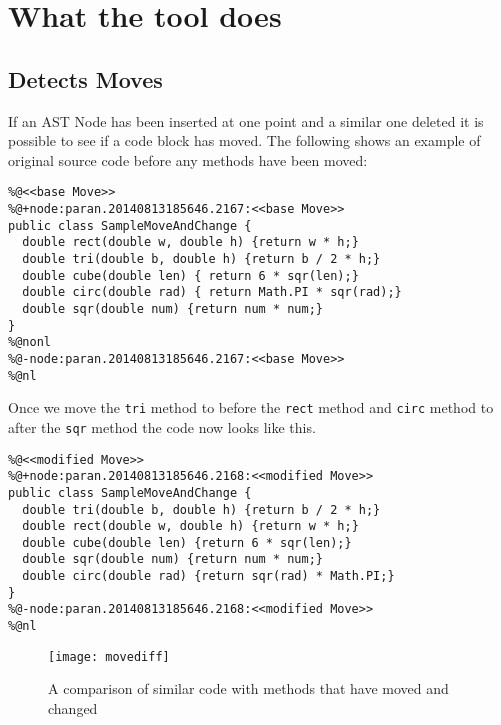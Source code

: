 \section{What the tool does}
\subsection{Detects Moves}
If an AST Node has been inserted at one point and a similar one deleted it is possible to see if a code block has moved.  
The following shows an example of original source code before any methods have been moved: 

\begin{lstlisting}
%@<<base Move>>
%@+node:paran.20140813185646.2167:<<base Move>>
public class SampleMoveAndChange {
  double rect(double w, double h) {return w * h;}
  double tri(double b, double h) {return b / 2 * h;}
  double cube(double len) { return 6 * sqr(len);}
  double circ(double rad) { return Math.PI * sqr(rad);}
  double sqr(double num) {return num * num;}
}
%@nonl
%@-node:paran.20140813185646.2167:<<base Move>>
%@nl
\end{lstlisting}

Once we move the \lstinline{tri} method to before the \lstinline{rect} method and \lstinline{circ} method to after the \lstinline{sqr} method the code now looks like this.

\begin{lstlisting}
%@<<modified Move>>
%@+node:paran.20140813185646.2168:<<modified Move>>
public class SampleMoveAndChange {
  double tri(double b, double h) {return b / 2 * h;}
  double rect(double w, double h) {return w * h;}
  double cube(double len) {return 6 * sqr(len);}
  double sqr(double num) {return num * num;}
  double circ(double rad) {return sqr(rad) * Math.PI;}
}
%@-node:paran.20140813185646.2168:<<modified Move>>
%@nl
\end{lstlisting}


\begin{figure}[!t]
\begin{center}
 \texttt{[image: movediff]}
 \end{center}
\caption{A comparison of similar code with methods that have moved and changed}
 \label{fig:orig}
\end{figure}


